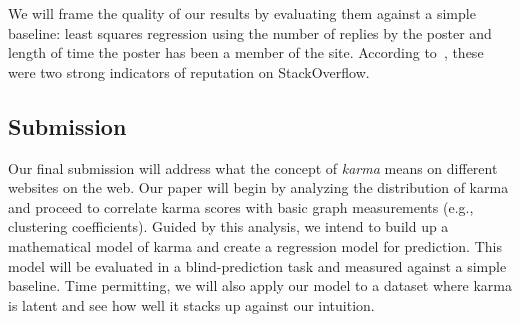 \documentclass[10pt]{article}
\begin{document}
We will frame the quality of our results by evaluating them against a simple
baseline: least squares regression using the number of replies by the poster and
length of time the poster has been a member of the site. According
to~\citet{movshovitzanalysis}, these were two strong indicators of reputation on
StackOverflow. 

\subsection{Submission}

Our final submission will address what the concept of \textit{karma} means on
different websites on the web. Our paper will begin by analyzing the
distribution of karma and proceed to correlate karma scores with basic graph
measurements (e.g., clustering coefficients). Guided by this analysis, we intend
to build up a mathematical model of karma and create a regression model for
prediction. This model will be evaluated in a blind-prediction task and measured
against a simple baseline. Time permitting, we will also apply our
model to a dataset where karma is latent and see how well it stacks up
against our intuition.



\end{document}
